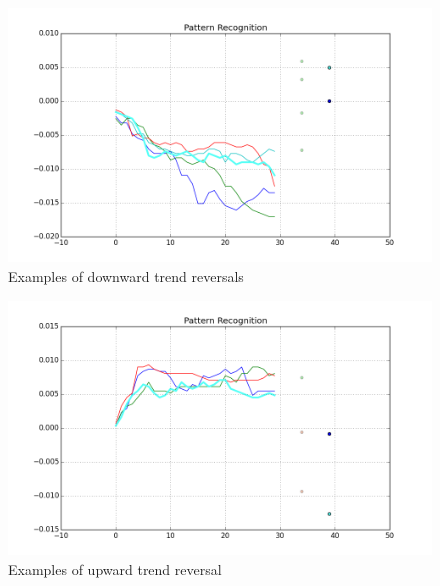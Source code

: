 \documentclass{article}
\begin{document}
\begin{figure}[h!]
\begin{center}
        \includegraphics[scale=0.3]{figure_2}
        \caption{Examples of downward trend reversals}
\end{center}
\end{figure}

\begin{figure}[h!]
\begin{center}
        \includegraphics[scale=0.3]{figure_3}
        \caption{Examples of upward trend reversal}
\end{center}
\end{figure}
\end{document}

